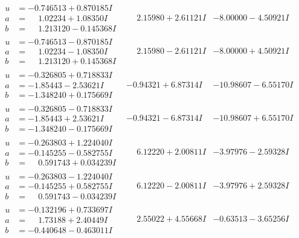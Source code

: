 \documentclass[1p]{elsarticle_modified}
\theoremstyle{definition}
\begin{document}
$$\begin{array}{c|c|c}
\begin{aligned}
u &= -0.746513 + 0.870185 I \\
a &= \phantom{-}1.02234 + 1.08350 I \\
b &= \phantom{-}1.213120 - 0.145368 I\end{aligned}
 & \phantom{-}2.15980 + 2.61121 I & -8.00000 - 4.50921 I \\ \hline\begin{aligned}
u &= -0.746513 - 0.870185 I \\
a &= \phantom{-}1.02234 - 1.08350 I \\
b &= \phantom{-}1.213120 + 0.145368 I\end{aligned}
 & \phantom{-}2.15980 - 2.61121 I & -8.00000 + 4.50921 I \\ \hline\begin{aligned}
u &= -0.326805 + 0.718833 I \\
a &= -1.85443 - 2.53621 I \\
b &= -1.348240 + 0.175669 I\end{aligned}
 & -0.94321 + 6.87314 I & -10.98607 - 6.55170 I \\ \hline\begin{aligned}
u &= -0.326805 - 0.718833 I \\
a &= -1.85443 + 2.53621 I \\
b &= -1.348240 - 0.175669 I\end{aligned}
 & -0.94321 - 6.87314 I & -10.98607 + 6.55170 I \\ \hline\begin{aligned}
u &= -0.263803 + 1.224040 I \\
a &= -0.145255 - 0.582755 I \\
b &= \phantom{-}0.591743 + 0.034239 I\end{aligned}
 & \phantom{-}6.12220 + 2.00811 I & -3.97976 - 2.59328 I \\ \hline\begin{aligned}
u &= -0.263803 - 1.224040 I \\
a &= -0.145255 + 0.582755 I \\
b &= \phantom{-}0.591743 - 0.034239 I\end{aligned}
 & \phantom{-}6.12220 - 2.00811 I & -3.97976 + 2.59328 I \\ \hline\begin{aligned}
u &= -0.132196 + 0.733697 I \\
a &= \phantom{-}1.73188 + 2.40449 I \\
b &= -0.440648 - 0.463011 I\end{aligned}
 & \phantom{-}2.55022 + 4.55668 I & -0.63513 - 3.65256 I \\ \hline\begin{aligned}

\end{aligned}
\end{array}$$
\end{document}
